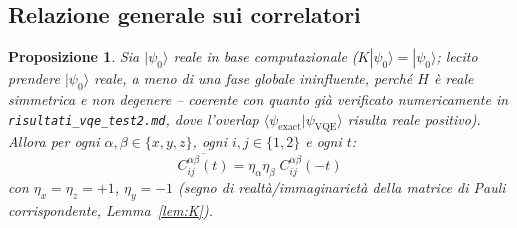\documentclass[11pt,a4paper]{article}
\newtheorem{proposizione}{Proposizione}
\begin{document}
\subsection{Relazione generale sui correlatori}

\begin{proposizione}
\label{prop:K-correlatore}
Sia $|\psi_0\rangle$ reale in base computazionale ($K|\psi_0\rangle=|\psi_0\rangle$; lecito
prendere $|\psi_0\rangle$ reale, a meno di una fase globale ininfluente, perché $H$ è reale
simmetrica e non degenere -- coerente con quanto già verificato numericamente in
\texttt{risultati\_vqe\_test2.md}, dove l'overlap $\langle\psi_{\mathrm{exact}}|\psi_{\mathrm{VQE}}\rangle$
risulta reale positivo). Allora per ogni $\alpha,\beta\in\{x,y,z\}$, ogni $i,j\in\{1,2\}$ e ogni
$t$:
\begin{equation}
\boxed{\;\overline{C_{ij}^{\alpha\beta}(t)} = \eta_\alpha\eta_\beta\; C_{ij}^{\alpha\beta}(-t)\;}
\label{eq:K-corr}
\end{equation}
con $\eta_x=\eta_z=+1$, $\eta_y=-1$ (segno di realtà/immaginarietà della matrice di Pauli
corrispondente, Lemma~\ref{lem:K}).
\end{proposizione}
\end{document}
